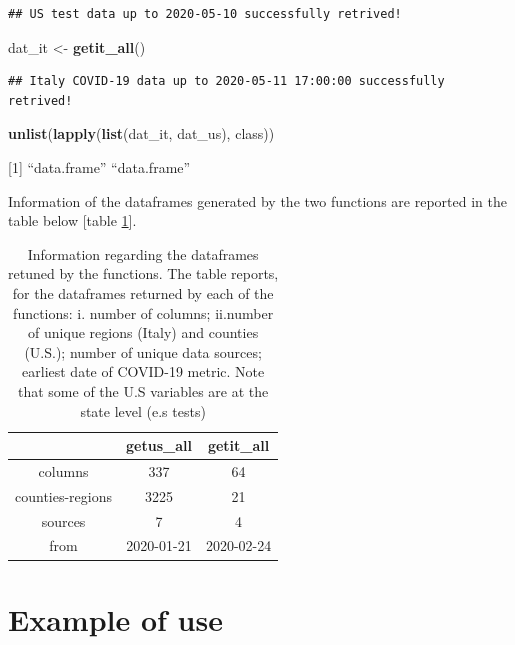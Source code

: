 \documentclass[12pt,halfline,a4paper,]{ouparticle}
\newenvironment{Shaded}{\begin{snugshade}}{\end{snugshade}}
\newcommand{\KeywordTok}[1]{\textcolor[rgb]{0.13,0.29,0.53}{\textbf{#1}}}
\newcommand{\NormalTok}[1]{#1}
\newcommand{\StringTok}[1]{\textcolor[rgb]{0.31,0.60,0.02}{#1}}
\begin{document}
\begin{verbatim}
## US test data up to 2020-05-10 successfully retrived!
\end{verbatim}

\begin{Shaded}
\begin{Highlighting}[]
\NormalTok{dat_it <-}\StringTok{ }\KeywordTok{getit_all}\NormalTok{()}
\end{Highlighting}
\end{Shaded}

\begin{verbatim}
## Italy COVID-19 data up to 2020-05-11 17:00:00 successfully retrived!
\end{verbatim}

\begin{Shaded}
\begin{Highlighting}[]
\KeywordTok{unlist}\NormalTok{(}\KeywordTok{lapply}\NormalTok{(}\KeywordTok{list}\NormalTok{(dat_it, dat_us), class))}
\end{Highlighting}
\end{Shaded}

{[}1{]} ``data.frame'' ``data.frame''

\bigskip

Information of the dataframes generated by the two functions are
reported in the table below {[}table \ref{tab:tab_dat}{]}.

\bigskip

\begin{table}[ht]
\centering
\begin{tabular}{ccc}
  \hline
 & getus\_all & getit\_all \\ 
  \hline
columns & 337 & 64 \\ 
  counties-regions & 3225 & 21 \\ 
  sources & 7 & 4 \\ 
  from & 2020-01-21 & 2020-02-24 \\ 
   \hline
\end{tabular}
\caption{Information regarding the dataframes retuned by the functions.
    The table reports, for the dataframes returned by each of the functions: i. number of columns; ii.number of unique regions (Italy) and counties (U.S.);  number of unique data sources; earliest date of COVID-19 metric. Note that some of 
    the U.S variables are at the state level (e.s tests)
    } 
\label{tab:tab_dat}
\end{table}

\hypertarget{example-of-use}{%
\section{Example of use}\label{example-of-use}}
\end{document}
